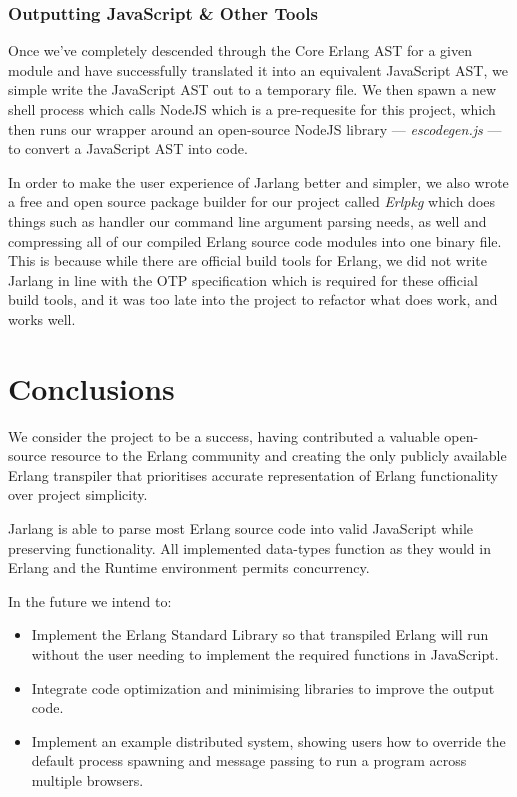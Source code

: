\documentclass[twoside,12pt,titlepage,a4paper]{article}
\newcommand\blankpage{%
    \null
    \thispagestyle{empty}%
    \addtocounter{page}{-1}%
    \newpage}
\begin{document}
\subsubsection{Outputting JavaScript \& Other Tools}
Once we've completely descended through the Core Erlang AST for a given module and have successfully translated it into an equivalent JavaScript AST, we simple write the JavaScript AST out to a temporary file. We then spawn a new shell process which calls NodeJS which is a pre-requesite for this project, which then runs our wrapper around an open-source NodeJS library --- \textit{escodegen.js} --- to convert a JavaScript AST into code.

In order to make the user experience of Jarlang better and simpler, we also wrote a free and open source package builder for our project called \textit{Erlpkg} which does things such as handler our command line argument parsing needs, as well and compressing all of our compiled Erlang source code modules into one binary file. This is because while there are official build tools for Erlang, we did not write Jarlang in line with the OTP specification which is required for these official build tools, and it was too late into the project to refactor what does work, and works well.

\blankpage
\section{Conclusions}
\label{Conclusions}
We consider the project to be a success, having contributed a valuable open-source resource to the Erlang community and creating the only publicly available Erlang transpiler that prioritises accurate representation of Erlang functionality over project simplicity.

Jarlang is able to parse most Erlang source code into valid JavaScript while preserving functionality. All implemented data-types function as they would in Erlang and the Runtime environment permits concurrency.

In the future we intend to:
\begin{itemize}
	\item Implement the Erlang Standard Library so that transpiled Erlang will run without the user needing to implement the required functions in JavaScript.
	\item Integrate code optimization and minimising libraries to improve the output code.
	\item Implement an example distributed system, showing users how to override the default process spawning and message passing to run a program across multiple browsers.
\end{itemize} 
\end{document}
